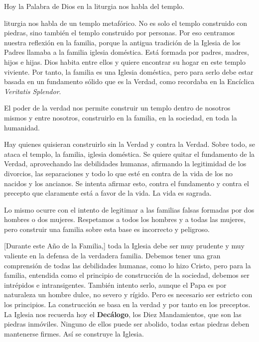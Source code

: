 \begin{body}
Hoy la Palabra de Dios en la liturgia nos habla del templo. 


 liturgia nos habla de un templo metafórico. No es solo el templo construido con piedras, sino también el templo construido por personas. Por eso centramos nuestra reflexión en la familia, porque la antigua tradición de la Iglesia de los Padres llamaba a la familia iglesia doméstica. Está formada por padres, madres, hijos e hijas. Dios habita entre ellos y quiere encontrar su hogar en este templo viviente. Por tanto, la familia es una Iglesia doméstica, pero para serlo debe estar basada en un fundamento sólido que es la Verdad, como recordaba en la Encíclica \textit{Veritatis Splendor}.

El poder de la verdad nos permite construir un templo dentro de nosotros mismos y entre nosotros, construirlo en la familia, en la sociedad, en toda la humanidad.

Hay quienes quisieran construirlo sin la Verdad y contra la Verdad. Sobre todo, se ataca el templo, la familia, iglesia doméstica. Se quiere quitar el fundamento de la Verdad, aprovechando las debilidades humanas, afirmando la legitimidad de los divorcios, las separaciones y todo lo que esté en contra de la vida de los no nacidos y los ancianos. Se intenta afirmar esto, contra el fundamento y contra el precepto que claramente está a favor de la vida. La vida es sagrada.

Lo mismo ocurre con el intento de legitimar a las familias falsas formadas por dos hombres o dos mujeres. Respetamos a todos los hombres y a todas las mujeres, pero construir una familia sobre esta base es incorrecto y peligroso.

[Durante este Año de la Familia,] toda la Iglesia debe ser muy prudente y muy valiente en la defensa de la verdadera familia. Debemos tener una gran comprensión de todas las debilidades humanas, como lo hizo Cristo, pero para la familia, entendida como el principio de construcción de la sociedad, debemos ser intrépidos e intransigentes. También intento serlo, aunque el Papa es por naturaleza un hombre dulce, no severo y rígido. Pero es necesario ser estricto con los principios. La construcción se basa en la verdad y por tanto en los preceptos. La Iglesia nos recuerda hoy el \textbf{Decálogo}, los Diez Mandamientos, que son las piedras inmóviles. Ninguno de ellos puede ser abolido, todas estas piedras deben mantenerse firmes. Así se construye la Iglesia.


\end{body}

